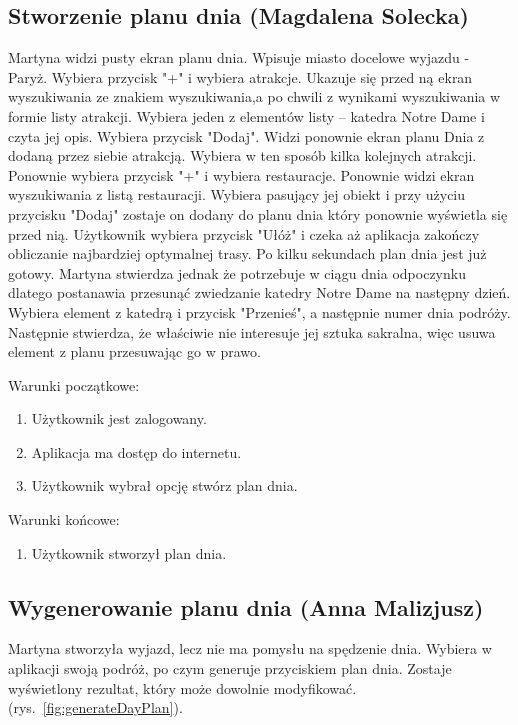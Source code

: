 \documentclass[10pt,twoside,a4paper]{report}
\begin{document}
\subsection{Stworzenie planu dnia (Magdalena Solecka)}
\par Martyna widzi pusty ekran planu dnia. Wpisuje miasto docelowe wyjazdu - Paryż. Wybiera przycisk "+" i wybiera atrakcje. Ukazuje się przed ną ekran wyszukiwania ze znakiem wyszukiwania,a po chwili z wynikami wyszukiwania w formie listy atrakcji. Wybiera jeden z elementów listy – katedra Notre Dame i czyta jej opis. Wybiera przycisk "Dodaj". Widzi ponownie ekran planu Dnia z dodaną przez siebie atrakcją. Wybiera w ten sposób kilka kolejnych atrakcji. Ponownie wybiera przycisk "+" i wybiera restauracje. Ponownie widzi ekran wyszukiwania z listą restauracji. Wybiera pasujący jej obiekt i przy użyciu przycisku "Dodaj" zostaje on dodany do  planu dnia który ponownie wyświetla się przed nią. Użytkownik wybiera przycisk "Ułóż" i czeka aż aplikacja zakończy obliczanie najbardziej optymalnej trasy. Po kilku sekundach plan dnia jest już gotowy. Martyna stwierdza jednak że potrzebuje w ciągu dnia odpoczynku dlatego postanawia przesunąć zwiedzanie katedry Notre Dame na następny dzień. Wybiera element z katedrą i przycisk "Przenieś", a następnie numer dnia podróży. Następnie stwierdza, że właściwie nie interesuje jej sztuka sakralna, więc usuwa element z planu przesuwając go w prawo.

\noindent\newline Warunki początkowe:
\begin{enumerate}
  \item Użytkownik jest zalogowany.
  \item Aplikacja ma dostęp do internetu.
  \item Użytkownik wybrał opcję stwórz plan dnia.
\end{enumerate}

\par
\noindent\newline
Warunki końcowe:
\begin{enumerate}
  \item Użytkownik stworzył plan dnia.
\end{enumerate}

\subsection{Wygenerowanie planu dnia (Anna Malizjusz)}
\par Martyna stworzyła wyjazd, lecz nie ma pomysłu na spędzenie dnia. Wybiera w aplikacji swoją podróż, po czym generuje przyciskiem plan dnia. Zostaje wyświetlony rezultat, który może dowolnie modyfikować. (rys.~\ref{fig:generateDayPlan}).
\end{document}
